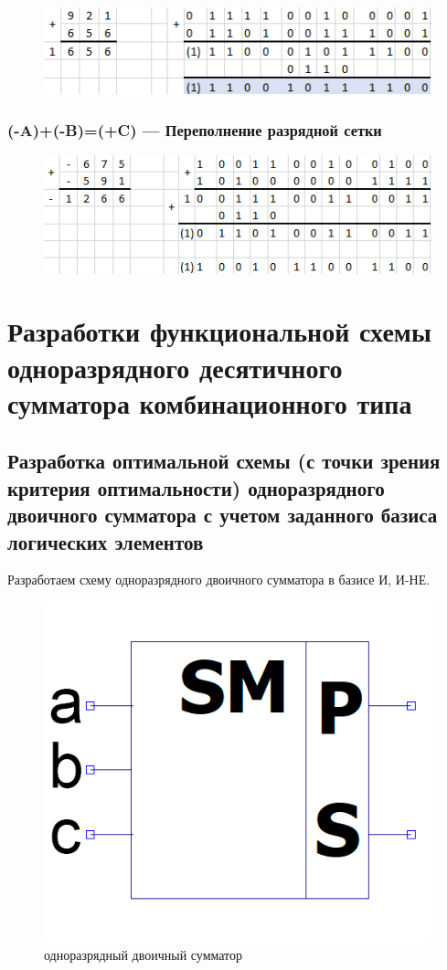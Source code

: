 \documentclass[a4paper,14pt]{article}
\begin{document}
\begin{figure}[H]
	\centering
	\includegraphics[width=0.7\linewidth]{primeri/screenshot005}
	\caption{}
	\label{fig:screenshot005}
\end{figure}


\subsubsection{(-A)+(-B)=(+C) — Переполнение разрядной сетки}


\begin{figure}[H]
	\centering
	\includegraphics[width=0.7\linewidth]{primeri/screenshot006}
	\caption{}
	\label{fig:screenshot006}
\end{figure}

\section{Разработки функциональной схемы одноразрядного десятичного сумматора комбинационного типа}

\subsection{Разработка оптимальной схемы (с точки зрения критерия оптимальности) одноразрядного двоичного сумматора с учетом заданного базиса логических элементов}

Разработаем схему одноразрядного двоичного сумматора в базисе И, И-НЕ.

\begin{figure}[H]
	\centering
	\includegraphics[width=0.4\linewidth]{images/dvSum_el}
	\caption{одноразрядный двоичный сумматор}
	\label{fig:dvSum_el}
\end{figure}
\end{document}
